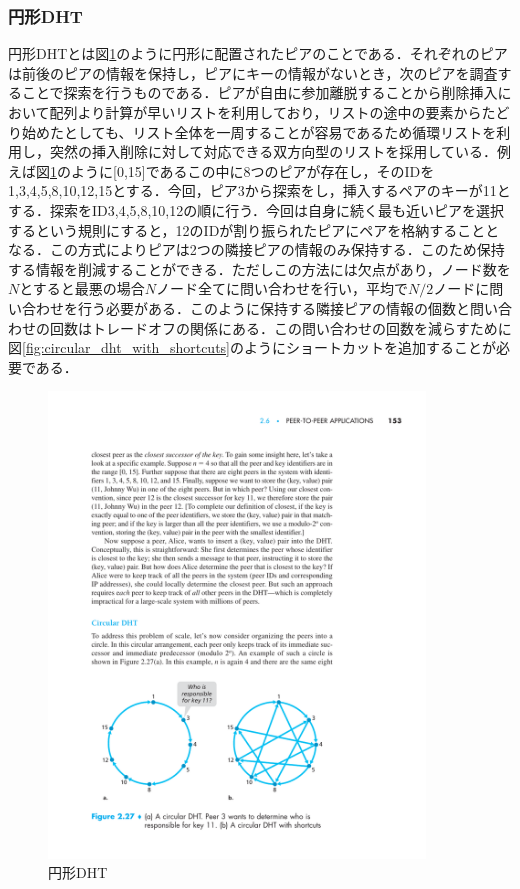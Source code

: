 \documentclass[9pt,a4j,twocolumn]{jsarticle}
\begin{document}
\subsubsection{円形DHT}
円形DHTとは図\ref{fig:circular_dht}のように円形に配置されたピアのことである．それぞれのピアは前後のピアの情報を保持し，ピアにキーの情報がないとき，次のピアを調査することで探索を行うものである．ピアが自由に参加離脱することから削除挿入において配列より計算が早いリストを利用しており，リストの途中の要素からたどり始めたとしても、リスト全体を一周することが容易であるため循環リストを利用し，突然の挿入削除に対して対応できる双方向型のリストを採用している．例えば図\ref{fig:circular_dht}のように[0,15]であるこの中に8つのピアが存在し，そのIDを1,3,4,5,8,10,12,15とする．今回，ピア3から探索をし，挿入するペアのキーが11とする．探索をID3,4,5,8,10,12の順に行う．今回は自身に続く最も近いピアを選択するという規則にすると，12のIDが割り振られたピアにペアを格納することとなる．この方式によりピアは2つの隣接ピアの情報のみ保持する．このため保持する情報を削減することができる．ただしこの方法には欠点があり，ノード数を$N$とすると最悪の場合$N$ノード全てに問い合わせを行い，平均で$N/2$ノードに問い合わせを行う必要がある．このように保持する隣接ピアの情報の個数と問い合わせの回数はトレードオフの関係にある．この問い合わせの回数を減らすために図\ref{fig:circular_dht_with_shortcuts}のようにショートカットを追加することが必要である．
\\
\begin{figure}[tb]
\includegraphics[width=10cm,pagebox=cropbox,clip]{CircularDHT.pdf}
 \caption{円形DHT}
 \label{fig:circular_dht}
\end{figure}
\end{document}
